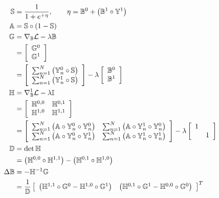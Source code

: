 \begin{align}
  \mathbb{S} &= \frac{1}{1+e^{+\eta}},\qquad \eta = \mathbb{B}^0 + \left(\mathbb{B}^1\circ\mathbb{Y}^1\right)\\
  \mathbb{A} &= \mathbb{S}\circ\left(1-\mathbb{S}\right)\\
  \mathbb{G} &= \nabla_{\mathbb{B}}\mathcal{L} - \lambda\mathbb{B} \nonumber\\
          &= \left[\begin{array}{c}
               \mathbb{G}^0 \\
               \mathbb{G}^1
             \end{array}\right] \nonumber\\
          &= \left[\begin{array}{c}
               \sum_{n=1}^{N}\left( \mathbb{Y}_n^0\circ\mathbb{S} \right) \\
               \sum_{n=1}^{N}\left( \mathbb{Y}_n^1\circ\mathbb{S} \right)
             \end{array}\right]
           - \lambda\left[\begin{array}{c}
               \mathbb{B}^0 \\
               \mathbb{B}^1
             \end{array}\right] \\
  \mathbb{H} &= \nabla_{\mathbb{B}}^1\mathcal{L} -\lambda\mathbb{I} \nonumber\\
          &= \left[\begin{array}{cc}
               \mathbb{H}^{0,0} & \mathbb{H}^{0,1} \\
               \mathbb{H}^{1,0} & \mathbb{H}^{1,1}
              \end{array}\right] \nonumber\\
          &= \left[\begin{array}{cc}
               \sum_{n=1}^{N}\left( \mathbb{A}\circ\mathbb{Y}_n^0\circ\mathbb{Y}_n^0 \right) & 
               \sum_{n=1}^{N}\left( \mathbb{A}\circ\mathbb{Y}_n^1\circ\mathbb{Y}_n^0 \right) \\
               \sum_{n=1}^{N}\left( \mathbb{A}\circ\mathbb{Y}_n^0\circ\mathbb{Y}_n^1 \right) & 
               \sum_{n=1}^{N}\left( \mathbb{A}\circ\mathbb{Y}_n^1\circ\mathbb{Y}_n^1 \right)
             \end{array}\right] - \lambda\left[\begin{array}{cc} 1 & \\ & 1\end{array}\right]\\
  \mathbb{D} &= \det{\mathbb{H}} \nonumber\\
          &= \left(\mathbb{H}^{0,0}\circ\mathbb{H}^{1,1}\right)
           - \left(\mathbb{H}^{0,1}\circ\mathbb{H}^{1,0}\right) \\
  \Delta\mathbb{B} &= -\mathbb{H}^{-1}\mathbb{G} \nonumber\\
          &= \dfrac{1}{\mathbb{D}}
             \left[\begin{array}{cc}
               \left(\mathbb{H}^{1,1}\circ\mathbb{G}^{0} - \mathbb{H}^{1,0}\circ\mathbb{G}^{1} \right) & 
               \left(\mathbb{H}^{0,1}\circ\mathbb{G}^{1} - \mathbb{H}^{0,0}\circ\mathbb{G}^{0} \right)
             \end{array}\right]^{T}
\end{align}
